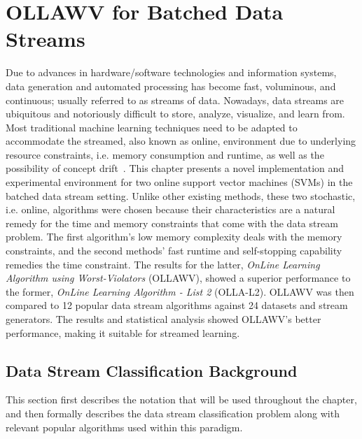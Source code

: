 \documentclass[reqno]{vcuthesis}
\numberwithin{equation}{chapter}
\begin{document}
\chapter{OLLAWV for Batched Data Streams}\label{chap:streams}
Due to advances in hardware/software technologies and information systems, data generation and automated processing has become fast, voluminous, and continuous; usually referred to as streams of data. Nowadays, data streams are ubiquitous and notoriously difficult to store, analyze, visualize, and learn from. Most traditional machine learning techniques need to be adapted to accommodate the streamed, also known as online, environment due to underlying resource constraints, i.e. memory consumption and runtime, as well as the possibility of concept drift~\cite{gama2014survey}. This chapter presents a novel implementation and experimental environment for two online support vector machines (SVMs) in the batched data stream setting. Unlike other existing methods, these two stochastic, i.e. online, algorithms were chosen because their characteristics are a natural remedy for the time and memory constraints that come with the data stream problem. The first algorithm's low memory complexity deals with the memory constraints, and the second methods' fast runtime and self-stopping capability remedies the time constraint. The results for the latter, \textit{OnLine Learning Algorithm using Worst-Violators} (OLLAWV), showed a superior performance to the former, \textit{OnLine Learning Algorithm - List 2} (OLLA-L2). OLLAWV was then compared to 12 popular data stream algorithms against 24 datasets and stream generators. The results and statistical analysis showed OLLAWV's better performance, making it suitable for streamed learning. 

\section{Data Stream Classification Background}
This section first describes the notation that will be used throughout the chapter, and then formally describes the data stream classification problem along with relevant popular algorithms used within this paradigm.
\end{document}
